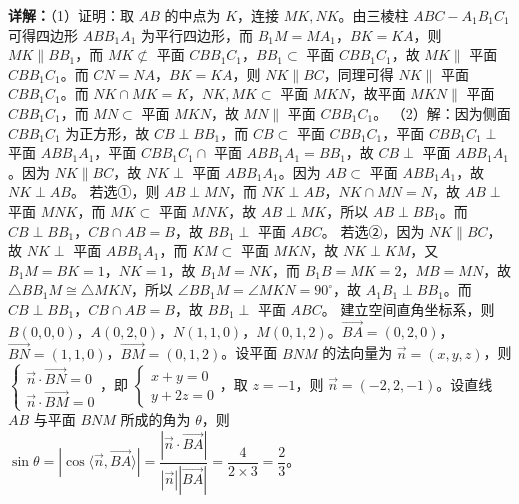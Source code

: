 \begin{question}[points=14]
\begin{solution}
\textbf{详解：}（1）证明：取 $AB$ 的中点为 $K$，连接 $MK,NK$。由三棱柱 $ABC-A_1B_1C_1$ 可得四边形 $ABB_1A_1$ 为平行四边形，而 $B_1M=MA_1$，$BK=KA$，则 $MK\parallel BB_1$，而 $MK\not\subset$ 平面 $CBB_1C_1$，$BB_1\subset$ 平面 $CBB_1C_1$，故 $MK\parallel$ 平面 $CBB_1C_1$。而 $CN=NA$，$BK=KA$，则 $NK\parallel BC$，同理可得 $NK\parallel$ 平面 $CBB_1C_1$。而 $NK\cap MK=K$，$NK,MK\subset$ 平面 $MKN$，故平面 $MKN\parallel$ 平面 $CBB_1C_1$，而 $MN\subset$ 平面 $MKN$，故 $MN\parallel$ 平面 $CBB_1C_1$。
（2）解：因为侧面 $CBB_1C_1$ 为正方形，故 $CB\perp BB_1$，而 $CB\subset$ 平面 $CBB_1C_1$，平面 $CBB_1C_1\perp$ 平面 $ABB_1A_1$，平面 $CBB_1C_1\cap$ 平面 $ABB_1A_1 = BB_1$，故 $CB\perp$ 平面 $ABB_1A_1$。因为 $NK\parallel BC$，故 $NK\perp$ 平面 $ABB_1A_1$。因为 $AB\subset$ 平面 $ABB_1A_1$，故 $NK\perp AB$。
若选①，则 $AB\perp MN$，而 $NK\perp AB$，$NK\cap MN=N$，故 $AB\perp$ 平面 $MNK$，而 $MK\subset$ 平面 $MNK$，故 $AB\perp MK$，所以 $AB\perp BB_1$。而 $CB\perp BB_1$，$CB\cap AB=B$，故 $BB_1\perp$ 平面 $ABC$。
若选②，因为 $NK\parallel BC$，故 $NK\perp$ 平面 $ABB_1A_1$，而 $KM\subset$ 平面 $MKN$，故 $NK\perp KM$，又 $B_1M=BK=1$，$NK=1$，故 $B_1M=NK$，而 $B_1B=MK=2$，$MB=MN$，故 $\triangle BB_1M\cong \triangle MKN$，所以 $\angle BB_1M = \angle MKN = 90^\circ$，故 $A_1B_1\perp BB_1$。而 $CB\perp BB_1$，$CB\cap AB=B$，故 $BB_1\perp$ 平面 $ABC$。
建立空间直角坐标系，则 $B(0,0,0)$，$A(0,2,0)$，$N(1,1,0)$，$M(0,1,2)$。$\overrightarrow{BA}=(0,2,0)$，$\overrightarrow{BN}=(1,1,0)$，$\overrightarrow{BM}=(0,1,2)$。设平面 $BNM$ 的法向量为 $\vec{n}=(x,y,z)$，则 $\begin{cases} \vec{n}\cdot\overrightarrow{BN}=0 \\ \vec{n}\cdot\overrightarrow{BM}=0 \end{cases}$，即 $\begin{cases} x+y=0 \\ y+2z=0 \end{cases}$，取 $z=-1$，则 $\vec{n}=(-2,2,-1)$。设直线 $AB$ 与平面 $BNM$ 所成的角为 $\theta$，则 $\sin\theta = |\cos\langle\vec{n},\overrightarrow{BA}\rangle| = \dfrac{|\vec{n}\cdot\overrightarrow{BA}|}{|\vec{n}||\overrightarrow{BA}|} = \dfrac{4}{2\times 3} = \dfrac{2}{3}$。
\end{solution}
\end{question}

